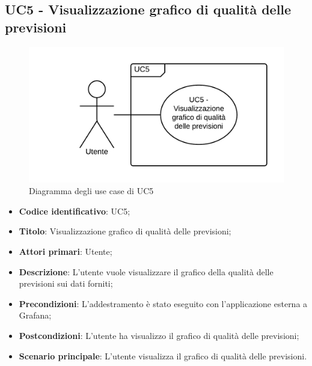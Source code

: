 \subsection{UC5 - Visualizzazione grafico di qualità delle previsioni}
\begin{figure}[H]
\includegraphics{img/UC5_-_Visualizzazione_grafico_di_qualita_delle_previsioni.png}
\caption{Diagramma degli use case di UC5}
\end{figure}
\begin{itemize}
	\item \textbf{Codice identificativo}: UC5;
	\item \textbf{Titolo}: Visualizzazione grafico di qualità delle previsioni;
	\item \textbf{Attori primari}: Utente;
	\item \textbf{Descrizione}: L'utente vuole visualizzare il grafico della qualità delle previsioni sui dati forniti;
	\item \textbf{Precondizioni}: L'addestramento è stato eseguito con l'applicazione esterna a Grafana\glo;
	\item \textbf{Postcondizioni}: L'utente ha visualizzo il grafico di qualità delle previsioni;
	\item \textbf{Scenario principale}: L'utente visualizza il grafico di qualità delle previsioni.
\end{itemize} 
